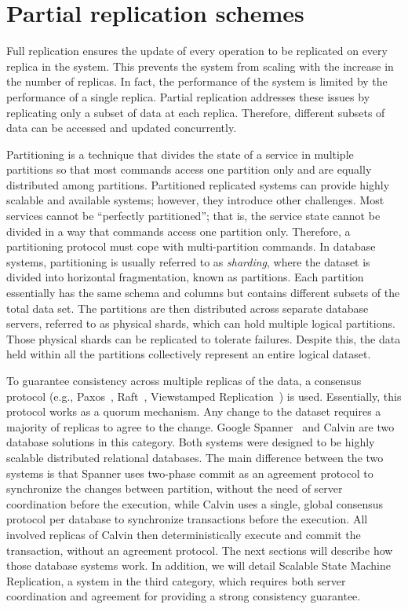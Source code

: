 \section{Partial replication schemes}

Full replication ensures the update of every operation to be replicated on
every replica in the system. This prevents the system from scaling with the
increase in the number of replicas. In fact, the performance of the system is
limited by the performance of a single replica. Partial replication addresses
these issues by replicating only a subset of data at each replica. Therefore,
different subsets of data can be accessed and updated concurrently. 

Partitioning is a technique that divides the state of a service in multiple
partitions so that most commands access one partition only and are equally
distributed among partitions. Partitioned replicated systems can provide highly
scalable and available systems; however, they introduce other challenges. Most
services cannot be ``perfectly partitioned''; that is, the service state cannot
be divided in a way that commands access one partition only. Therefore, a
partitioning protocol must cope with multi-partition commands. In database
systems, partitioning is usually referred to as \emph{sharding}, where the dataset
is divided into horizontal fragmentation, known as partitions. Each partition
essentially has the same schema and columns but contains different subsets of
the total data set. The partitions are then distributed across separate database
servers, referred to as physical shards, which can hold multiple logical
partitions. Those physical shards can be replicated to tolerate failures. 
Despite this, the data held within all the partitions collectively
represent an entire logical dataset. 

To guarantee consistency across multiple replicas of the data, a consensus
protocol (e.g., Paxos~\cite{Lam98}, Raft~\cite{184040}, Viewstamped
Replication~\cite{oki1988viewstamped}) is used. Essentially, this protocol works
as a quorum mechanism. Any change to the dataset requires a majority of replicas
to agree to the change. Google Spanner~\cite{corbett2013spanner} and Calvin
\cite{calvin} are two database solutions in this category. Both systems were
designed to be highly scalable distributed relational databases. The main
difference between the two systems is that Spanner uses two-phase commit as an
agreement protocol to synchronize the changes between partition, without the
need of server coordination before the execution, while Calvin uses a single,
global consensus protocol per database to synchronize transactions before the
execution. All involved replicas of Calvin then deterministically execute and
commit the transaction, without an agreement protocol. The next sections will
describe how those database systems work. In addition, we will detail Scalable
State Machine Replication, a system in the third category, which requires both
server coordination and agreement for providing a strong consistency guarantee.



